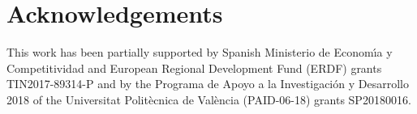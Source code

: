 \documentclass[preprint,10pt]{elsarticle}
\begin{document}



\section*{Acknowledgements}
This work has been partially supported by Spanish Ministerio de Econom\'{\i}a y Competitividad and European Regional Development Fund (ERDF) grants TIN2017-89314-P
and by the Programa de Apoyo a la Investigaci\'on y Desarrollo 2018 of the Universitat Polit\`{e}cnica de Val\`{e}ncia (PAID-06-18) grants SP20180016.



\end{document}
